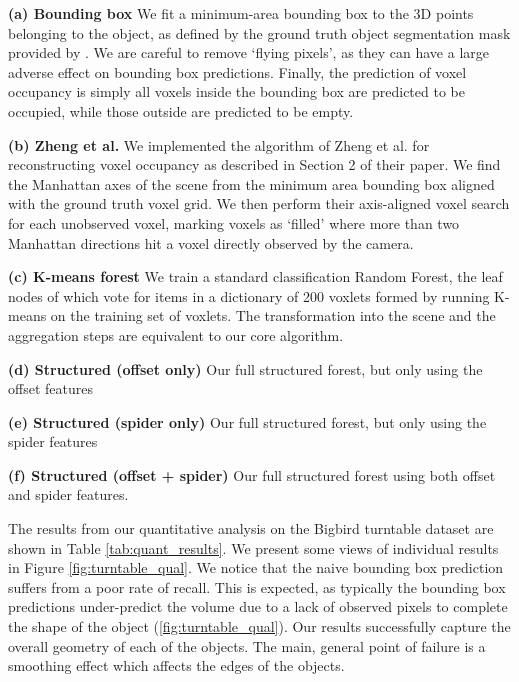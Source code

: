 \documentclass[10pt,twocolumn,letterpaper]{article}
\makeatletter
\newcommand*{\ea}{et al.\@\xspace}
\makeatother
\begin{document}
\noindent \textbf{(a) Bounding box} We fit a minimum-area bounding box to the 3D points belonging to the object, as defined by the ground truth object segmentation mask provided by \cite{singh-icra-2014}.
We are careful to remove `flying pixels', as they can have a large adverse effect on bounding box predictions.
Finally, the prediction of voxel occupancy is simply all voxels inside the bounding box are predicted to be occupied, while those outside are predicted to be empty.

\noindent \textbf{(b) Zheng \ea} \cite{zheng-cvpr-2013}
We implemented the algorithm of Zheng \ea \cite{zheng-cvpr-2013} for reconstructing voxel occupancy as described in Section 2 of their paper.
We find the Manhattan axes of the scene from the minimum area bounding box aligned with the ground truth voxel grid.
We then perform their axis-aligned voxel search for each unobserved voxel, marking voxels as `filled' where more than two Manhattan directions hit a voxel directly observed by the camera.



\noindent \textbf{(c) K-means forest} We train a standard classification Random Forest, the leaf nodes of which vote for items in a dictionary of 200 voxlets formed by running K-means on the training set of voxlets. The transformation into the scene and the aggregation steps are equivalent to our core algorithm.

\noindent \textbf{(d) Structured (offset only)} Our full structured forest, but only using the offset features

\noindent \textbf{(e) Structured (spider only)} Our full structured forest, but only using the spider features

\noindent \textbf{(f) Structured (offset + spider)}  Our full structured forest using both offset and spider features.

\vspace{10pt}

The results from our quantitative analysis on the Bigbird turntable dataset are shown in Table \ref{tab:quant_results}.
We present some views of individual results in Figure \ref{fig:turntable_qual}.
We notice that the naive bounding box prediction suffers from a poor rate of recall.
This is expected, as typically the bounding box predictions under-predict the volume due to a lack of observed pixels to complete the shape of the object (\ref{fig:turntable_qual}).
Our results successfully capture the overall geometry of each of the objects.
The main, general point of failure is a smoothing effect which affects the edges of the objects.
\end{document}
